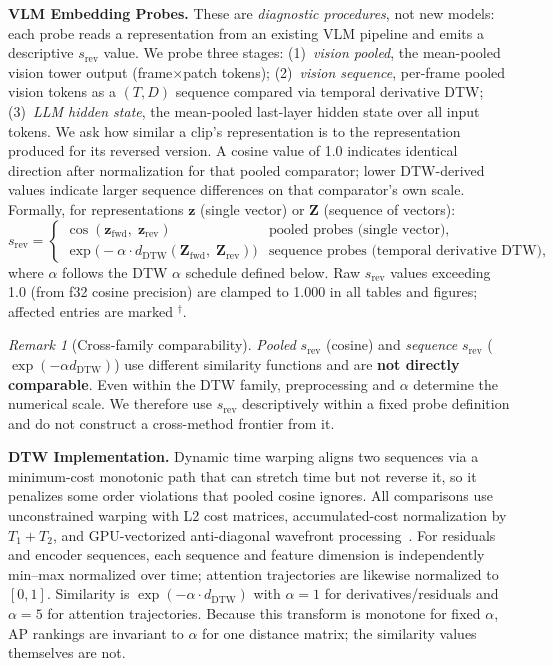 \documentclass{article}
\theoremstyle{remark}
\newtheorem{remark}{Remark}
\begin{document}
\textbf{VLM Embedding Probes.} These are \emph{diagnostic procedures}, not new models: each probe reads a representation from an existing VLM pipeline and emits a descriptive $s_\text{rev}$ value. We probe three stages: (1)~\emph{vision pooled}, the mean-pooled vision tower output (frame$\times$patch tokens); (2)~\emph{vision sequence}, per-frame pooled vision tokens as a $(T, D)$ sequence compared via temporal derivative DTW; (3)~\emph{LLM hidden state}, the mean-pooled last-layer hidden state over all input tokens. We ask how similar a clip's representation is to the representation produced for its reversed version. A cosine value of 1.0 indicates identical direction after normalization for that pooled comparator; lower DTW-derived values indicate larger sequence differences on that comparator's own scale. Formally, for representations $\mathbf{z}$ (single vector) or $\mathbf{Z}$ (sequence of vectors):
\begin{equation}
s_\text{rev} =
\begin{cases}
\cos(\mathbf{z}_\text{fwd},\; \mathbf{z}_\text{rev}) & \text{pooled probes (single vector),} \\[4pt]
\exp\!\bigl(-\alpha \cdot d_\text{DTW}(\mathbf{Z}_\text{fwd},\; \mathbf{Z}_\text{rev})\bigr) & \text{sequence probes (temporal derivative DTW),}
\end{cases}
\label{eq:srev}
\end{equation}
where $\alpha$ follows the DTW $\alpha$ schedule defined below. Raw $s_\text{rev}$ values exceeding 1.0 (from f32 cosine precision) are clamped to 1.000 in all tables and figures; affected entries are marked $^\dagger$.
\begin{remark}[Cross-family comparability]
\emph{Pooled} $s_\text{rev}$ (cosine) and \emph{sequence} $s_\text{rev}$ ($\exp(-\alpha d_\text{DTW})$) use different similarity functions and are \textbf{not directly comparable}. Even within the DTW family, preprocessing and $\alpha$ determine the numerical scale. We therefore use $s_\text{rev}$ descriptively within a fixed probe definition and do not construct a cross-method frontier from it.
\end{remark}

\textbf{DTW Implementation.} Dynamic time warping aligns two sequences via a minimum-cost monotonic path that can stretch time but not reverse it, so it penalizes some order violations that pooled cosine ignores. All comparisons use unconstrained warping with L2 cost matrices, accumulated-cost normalization by $T_1 + T_2$, and GPU-vectorized anti-diagonal wavefront processing~\cite{ddtw}. For residuals and encoder sequences, each sequence and feature dimension is independently min--max normalized over time; attention trajectories are likewise normalized to $[0,1]$. Similarity is $\exp(-\alpha \cdot d_\text{DTW})$ with $\alpha = 1$ for derivatives/residuals and $\alpha = 5$ for attention trajectories. Because this transform is monotone for fixed $\alpha$, AP rankings are invariant to $\alpha$ for one distance matrix; the similarity values themselves are not.
\end{document}
